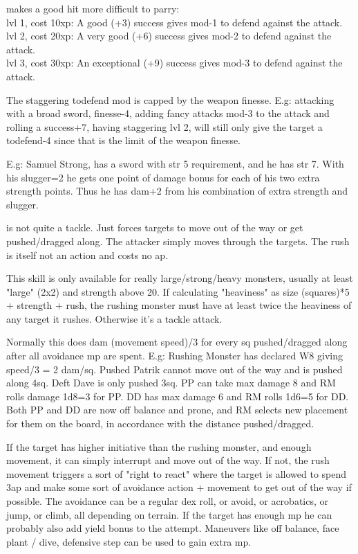  makes a good hit more difficult to parry: \\
lvl 1, cost 10xp: A good (+3) success gives mod-1 to defend against the attack.  \\
lvl 2, cost 20xp: A very good (+6) success gives mod-2 to defend against the attack.  \\
lvl 3, cost 30xp: An exceptional (+9) success gives mod-3 to defend against the attack.

The staggering todefend mod is capped by the weapon finesse. E.g: attacking with a broad sword, finesse-4, adding fancy attacks mod-3 to the attack and rolling a success+7, having staggering lvl 2, will still only give the target a todefend-4 since that is the limit of the weapon finesse.

E.g: Samuel Strong, has a sword with str 5 requirement, and he has str 7. With his slugger=2 he gets one point of damage bonus for each of his two extra strength points. Thus he has dam+2 from his combination of extra strength and slugger.


 is not quite a tackle. Just forces targets to move out of the way or get pushed/dragged along. The attacker simply moves through the targets. The rush is itself not an action and costs no ap.

This skill is only available for really large/strong/heavy monsters, usually at least "large" (2x2) and strength above 20. If calculating "heaviness" as size (squares)*5 + strength + rush, the rushing monster must have at least twice the heaviness of any target it rushes. Otherwise it's a tackle attack.

Normally this does dam (movement speed)/3 for every sq pushed/dragged along after all avoidance mp are spent. E.g: Rushing Monster has declared W8 giving speed/3 = 2 dam/sq. Pushed Patrik cannot move out of the way and is pushed along 4sq. Deft Dave is only pushed 3sq. PP can take max damage 8 and RM rolls damage 1d8=3 for PP. DD has max damage 6 and RM rolls 1d6=5 for DD. Both PP and DD are now off balance and prone, and RM selects new placement for them on the board, in accordance with the distance pushed/dragged.

If the target has higher initiative than the rushing monster, and enough movement, it can simply interrupt and move out of the way. If not, the rush movement triggers a sort of "right to react" where the target is allowed to spend 3ap and make some sort of avoidance action + movement to get out of the way if possible. The avoidance can be a regular dex roll, or avoid, or acrobatics, or jump, or climb, all depending on terrain. If the target has enough mp he can probably also add yield bonus to the attempt. Maneuvers like off balance, face plant / dive, defensive step can be used to gain extra mp.

